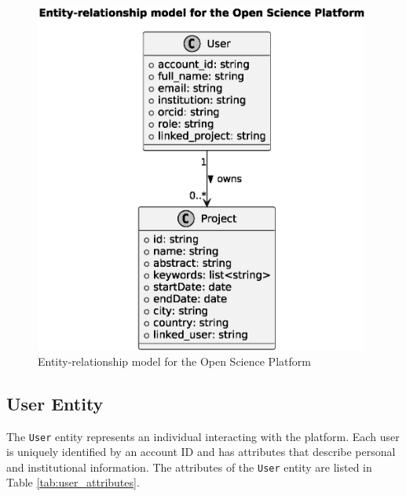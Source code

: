 \documentclass{article}
\begin{document}
\begin{figure}[htbp]
      \centering
      \includegraphics[width=0.98\textwidth, keepaspectratio]{entity_relationship_model.eps}
      \caption{Entity-relationship model for the Open Science Platform}
      \label{fig:er_model}
\end{figure}



\subsection{User Entity}
The \texttt{User} entity represents an individual interacting with the platform. Each user is uniquely identified by an account ID and has attributes that describe personal and institutional information. The attributes of the \texttt{User} entity are listed in Table \ref{tab:user_attributes}.
\end{document}

